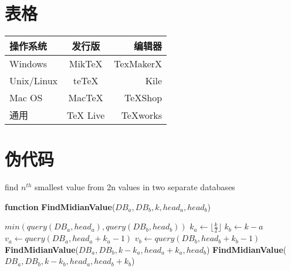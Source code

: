 \documentclass[UTF8]{ctexart}
\begin{document}
\section{表格}
\begin{tabular}{|l|c|r|}

    \hline
    操作系统       & 发行版      & 编辑器       \\
    \hline
    Windows    & MikTeX   & TexMakerX \\
    \hline
    Unix/Linux & teTeX    & Kile      \\
    \hline
    Mac OS     & MacTeX   & TeXShop   \\
    \hline
    通用         & TeX Live & TeXworks  \\
    \hline
\end{tabular}

\section{伪代码}
\begin{algorithm}[H]    
    \caption{find $n^{th}$ smallest  value from 2n values in two separate databases}
    \label{algo:1}
    \textbf{function}  \textbf{FindMidianValue}($DB_a,DB_b,k,head_a,head_b$) 
    \begin{algorithmic}[1]
            \RETURN $min(query(DB_a, head_a), query(DB_b, head_b))$
        \ENDIF
        \STATE $k_a \gets \lfloor \frac{k}{2} \rfloor $
        \STATE $k_b \gets k - a $
        \STATE $v_a\gets query(DB_a, head_a+k_a-1)$
        \STATE $v_b\gets query(DB_b, head_b+k_b-1)$
            \RETURN \textbf{FindMidianValue}($DB_a,DB_b,k-k_a,head_a+k_a,head_b$)
        \ELSE
            \RETURN \textbf{FindMidianValue}($DB_a,DB_b,k-k_b,head_a,head_b+k_b$)
        \ENDIF
    \end{algorithmic}
\end{algorithm}
\end{document}
